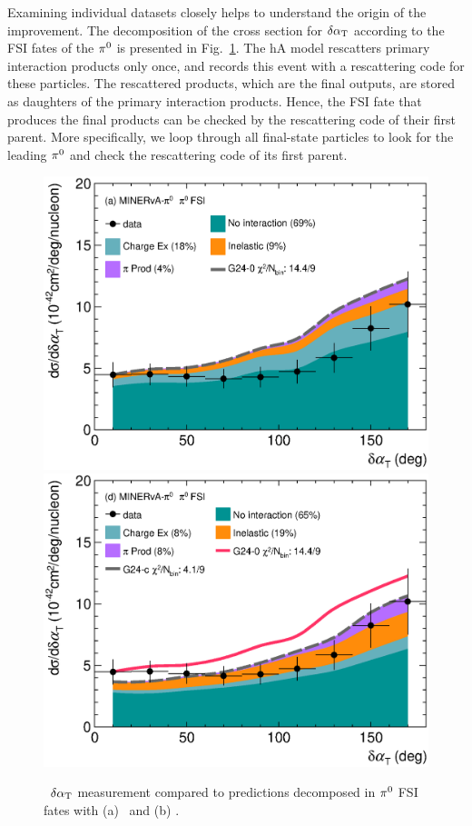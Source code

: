 Examining individual datasets closely helps to understand the origin of the improvement. The decomposition of the cross section for $\delta\alpha_\textrm{T}$ according to the FSI fates of the $\pi^0$ is presented in Fig.~\ref{fig:CEX-minpiz-dat-pi0}. The hA model rescatters primary interaction products only once, and records this event with a rescattering code for these particles. The rescattered products, which are the final outputs, are stored as daughters of the primary interaction products. Hence, the FSI fate that produces the final products can be checked by the rescattering code of their first parent. More specifically, we loop through all final-state particles to look for the leading $\pi^0$ and check the rescattering code of its first parent. 

\begin{figure}[!htb] 	
    \centering 		
    \includegraphics[width=\dbfigwid\textwidth]{figures/tuning/0000-min_pi0_dalphat_pi0_decomp_cex.eps}
    \includegraphics[width=\dbfigwid\textwidth]{figures/tuning/0026-min_pi0_dalphat_pi0_decomp_covfix.eps}	
    \caption{\label{fig:CEX-minpiz-dat-pi0} \minpiz\ $\delta\alpha_\textrm{T}$ measurement compared to \genie predictions decomposed in $\pi^0$ FSI fates with (a) \gZero\ and (b) \gC.} 
\end{figure}

